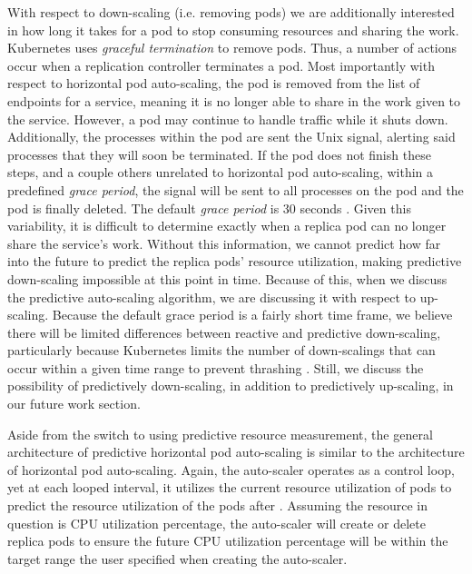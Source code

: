 With respect to down-scaling (i.e. removing pods) we are additionally
interested in how long it takes for a pod to stop consuming resources and
sharing the work. Kubernetes uses \textit{graceful termination} to remove pods. Thus, a
number of actions occur when a replication controller terminates a pod. Most
importantly with respect to horizontal pod auto-scaling, the pod is removed from
the list of endpoints for a service, meaning it is no longer able to share in
the work given to the service. However, a pod may continue to handle traffic while
it shuts down. Additionally, the processes within the pod are sent the
 Unix signal, alerting said processes that they will soon be
terminated. If the pod does not finish these steps, and a couple others
unrelated to horizontal pod auto-scaling, within a predefined \textit{grace
period}, the  signal will be sent to all processes on the pod
and the pod is finally deleted. The default \textit{grace period} is 30
seconds \cite{k8s-pods}. Given this variability, it is difficult
to determine exactly when a replica pod can no longer share the service's work.
Without this information, we cannot predict how far into the future to predict
the replica pods' resource utilization, making predictive down-scaling
impossible at this point in time. Because of
this, when we discuss the predictive auto-scaling algorithm, we are discussing it
with respect to up-scaling. Because the default grace period is a fairly short
time frame, we believe there will be limited differences between reactive and
predictive down-scaling, particularly because Kubernetes limits the number of
down-scalings that can occur within a given time range to prevent thrashing
\cite{k8s-horizontal-pod-autoscaler-proposal}. Still, we discuss the possibility
of predictively down-scaling, in addition to predictively up-scaling, in our
future work section.

Aside from the switch to using predictive resource measurement, the
general architecture of predictive horizontal pod auto-scaling is similar to the
architecture of horizontal pod auto-scaling. Again, the auto-scaler operates as a
control loop, yet at each looped interval, it utilizes the current resource
utilization of pods to predict the resource utilization of the pods after
. Assuming the resource in question is CPU
utilization percentage, the auto-scaler will create or delete replica pods
to ensure the future CPU utilization percentage will be within the target range
the user specified when creating the auto-scaler.
